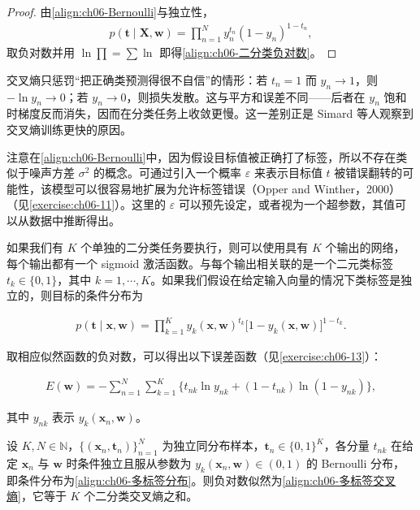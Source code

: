 \documentclass[../../main.tex]{subfiles}
\begin{document}
\begin{proof}
由\eqref{align:ch06-Bernoulli}与独立性，
\begin{align}
p(\boldsymbol{t}\mid\boldsymbol{X},\boldsymbol{w})=\prod_{n=1}^{N}y_n^{t_n}(1-y_n)^{1-t_n},
\end{align}
取负对数并用 $\ln\prod=\sum\ln$ 即得\eqref{align:ch06-二分类负对数}。
\end{proof}

\begin{remark}交叉熵只惩罚“把正确类预测得很不自信”的情形：若 $t_n=1$ 而 $y_n\to1$，则 $-\ln y_n\to0$；若 $y_n\to0$，则损失发散。这与平方和误差不同——后者在 $y_n$ 饱和时梯度反而消失，因而在分类任务上收敛更慢。这一差别正是 Simard 等人观察到交叉熵训练更快的原因。
\end{remark}

注意在\eqref{align:ch06-Bernoulli}中，因为假设目标值被正确打了标签，所以不存在类似于噪声方差 $\sigma^{2}$ 的概念。可通过引入一个概率 $\varepsilon$ 来表示目标值 $t$ 被错误翻转的可能性，该模型可以很容易地扩展为允许标签错误（Opper and Winther，2000）（见\cref{exercise:ch06-11}）。这里的 $\varepsilon$ 可以预先设定，或者视为一个超参数，其值可以从数据中推断得出。

如果我们有 $K$ 个单独的二分类任务要执行，则可以使用具有 $K$ 个输出的网络，每个输出都有一个 sigmoid 激活函数。与每个输出相关联的是一个二元类标签 $t_k\in\{0,1\}$，其中 $k=1,\cdots,K$。如果我们假设在给定输入向量的情况下类标签是独立的，则目标的条件分布为

\begin{align}
p(\boldsymbol{t}\mid\boldsymbol{x},\boldsymbol{w})=\prod_{k=1}^{K}y_k(\boldsymbol{x},\boldsymbol{w})^{t_k}\bigl[1-y_k(\boldsymbol{x},\boldsymbol{w})\bigr]^{1-t_k}.
\label{align:ch06-多标签分布}
\end{align}

取相应似然函数的负对数，可以得出以下误差函数（见\cref{exercise:ch06-13}）：

\begin{align}
E(\boldsymbol{w})=-\sum_{n=1}^{N}\sum_{k=1}^{K}\bigl\{t_{nk}\ln y_{nk}+(1-t_{nk})\ln(1-y_{nk})\bigr\},
\label{align:ch06-多标签交叉熵}
\end{align}

其中 $y_{nk}$ 表示 $y_k(\boldsymbol{x}_n,\boldsymbol{w})$。

\begin{proposition}[多标签交叉熵]\label{proposition:ch06-多标签交叉熵}
设 $K,N\in\mathbb{N}$，$\{(\boldsymbol{x}_{n},\boldsymbol{t}_{n})\}_{n=1}^{N}$ 为独立同分布样本，$\boldsymbol{t}_{n}\in\{0,1\}^{K}$，各分量 $t_{nk}$ 在给定 $\boldsymbol{x}_{n}$ 与 $\boldsymbol{w}$ 时条件独立且服从参数为 $y_{k}(\boldsymbol{x}_{n},\boldsymbol{w})\in(0,1)$ 的 Bernoulli 分布，即条件分布为\eqref{align:ch06-多标签分布}。则负对数似然为\eqref{align:ch06-多标签交叉熵}，它等于 $K$ 个二分类交叉熵之和。
\end{proposition}
\end{document}
